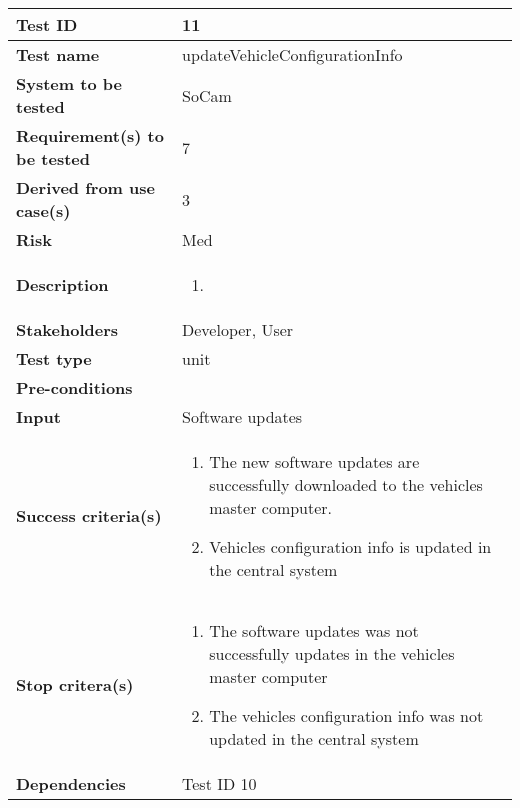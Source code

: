 		\begin{table}[H]
			\begin{tabular}{| p{4cm} | p{10cm} |}
			\hline
			\rowcolor{gray}
				{\bf Test ID} & 11 \\ \hline
				{\bf Test name} & updateVehicleConfigurationInfo \\ \hline
				{\bf System to be tested} & SoCam \\ \hline
				{\bf Requirement(s) to be tested} & 7 \\ \hline
				{\bf Derived from use case(s)} & 3 \\ \hline
				{\bf Risk} & Med \\ \hline
				{\bf Description} & 
					\begin{enumerate}
						\item
					\end{enumerate}
				\\ \hline
				{\bf Stakeholders} & Developer, User \\ \hline
				{\bf Test type} & unit \\ \hline
				{\bf Pre-conditions} & \\ \hline
				{\bf Input} & Software updates \\ \hline
				{\bf Success criteria(s)} & 
					\begin{enumerate}
						\item The new software updates are successfully downloaded to
						the vehicles master computer.
						\item Vehicles configuration info is updated in the central system
					\end{enumerate}
				\\ \hline
				{\bf Stop critera(s)} &  
					\begin{enumerate}
						\item The software updates was not successfully updates in the vehicles
						master computer
						\item The vehicles configuration info was not updated in the central system
					\end{enumerate} \\ \hline
				{\bf Dependencies} & Test ID 10 \\ \hline
			\end{tabular}
		\end{table}
